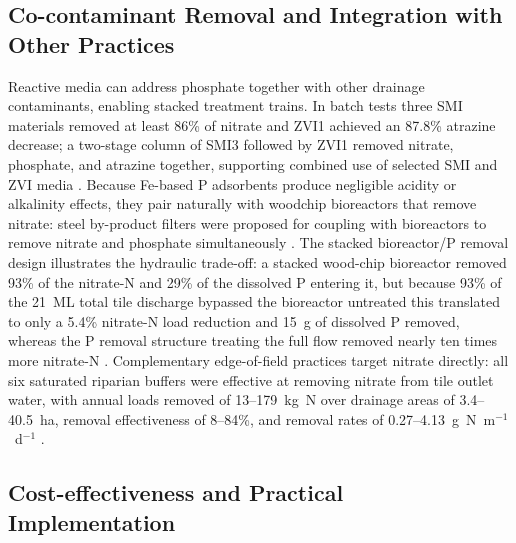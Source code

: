 \subsection{Co-contaminant Removal and Integration with Other Practices}

Reactive media can address phosphate together with other drainage contaminants,
enabling stacked treatment trains. In batch tests three SMI materials removed at
least 86\% of nitrate and ZVI1 achieved an 87.8\% atrazine decrease; a two-stage
column of SMI3 followed by ZVI1 removed nitrate, phosphate, and atrazine together,
supporting combined use of selected SMI and ZVI media \parencite{Allred2012}.
Because Fe-based P adsorbents produce negligible acidity or alkalinity effects,
they pair naturally with woodchip bioreactors that remove nitrate: steel
by-product filters were proposed for coupling with bioreactors to remove nitrate
and phosphate simultaneously \parencite{Sellner2019b}. The stacked bioreactor/P
removal design illustrates the hydraulic trade-off: a stacked wood-chip bioreactor
removed 93\% of the nitrate-N and 29\% of the dissolved P entering it, but because
93\% of the 21~ML total tile discharge bypassed the bioreactor untreated this
translated to only a 5.4\% nitrate-N load reduction and 15~g of dissolved P
removed, whereas the P removal structure treating the full flow removed nearly
ten times more nitrate-N \parencite{Penn2024}. Complementary edge-of-field
practices target nitrate directly: all six saturated riparian buffers were
effective at removing nitrate from tile outlet water, with annual loads removed of
13--179~kg~N over drainage areas of 3.4--40.5~ha, removal effectiveness of 8--84\%,
and removal rates of 0.27--4.13~g~N~m$^{-1}$~d$^{-1}$ \parencite{Jaynes2019}.

\subsection{Cost-effectiveness and Practical Implementation}

